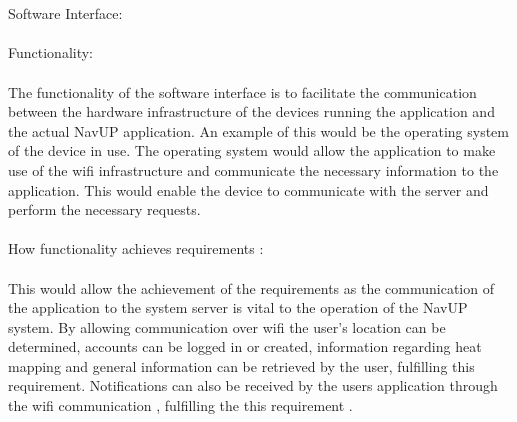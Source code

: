 \documentclass{article}
\begin{document}
{\\\\
Software Interface:
\\\\
Functionality:
\\\\
The functionality of the software interface is to facilitate the communication between the hardware infrastructure of the devices running the application and the actual NavUP application. An example of this would be the operating system of the device in use. The operating system would allow the application to make use of the wifi infrastructure and communicate the necessary information to the application. This would enable the device to communicate with the server and perform the necessary requests.
\\\\
How functionality achieves requirements :
\\\\
This would allow the achievement of the requirements as the communication of the application to the system server is vital to the operation of the NavUP system. By allowing communication over wifi the user's location can be determined, accounts can be logged in or created, information regarding heat mapping and general information can be retrieved by the user, fulfilling this requirement. Notifications can also be received by the users application through the wifi communication , fulfilling the this requirement .}

		
\end{document}
